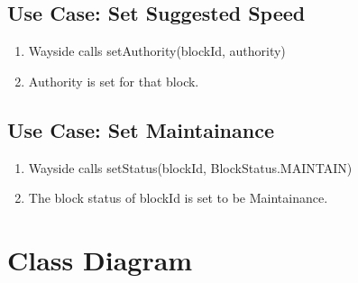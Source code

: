 \documentclass{scrreprt}
\begin{document}
\subsection{Use Case: Set Suggested Speed}
\begin{enumerate}
	\item Wayside calls setAuthority(blockId, authority)
	\item Authority is set for that block.
\end{enumerate}

\subsection{Use Case: Set Maintainance}
\begin{enumerate}
	\item Wayside calls setStatus(blockId, BlockStatus.MAINTAIN)
	\item The block status of blockId is set to be Maintainance.
\end{enumerate}


\section{Class Diagram}
\end{document}
